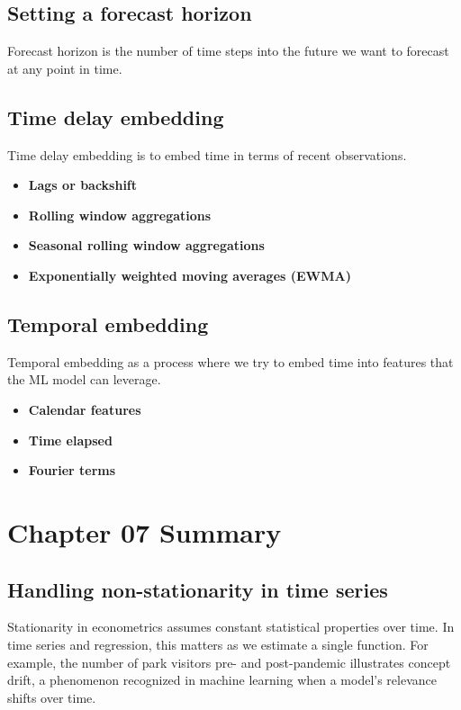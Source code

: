\documentclass{article}
\begin{document}
\subsection{Setting a forecast horizon}
Forecast horizon is the number of time steps into the future we want to forecast at any point in time.

\subsection{Time delay embedding}
Time delay embedding is to embed time in terms of recent observations.
\begin{itemize}
    \item \textbf{Lags or backshift}
    \item \textbf{Rolling window aggregations}
    \item \textbf{Seasonal rolling window aggregations}
    \item \textbf{Exponentially weighted moving averages (EWMA)}
\end{itemize}


\subsection{Temporal embedding}
Temporal embedding as a process where we try to embed time into features that the ML model can leverage. 
\begin{itemize}
    \item \textbf{Calendar features}
    \item \textbf{Time elapsed}
    \item \textbf{Fourier terms}
\end{itemize}

\section{Chapter 07 Summary}

\subsection{Handling non-stationarity in time series}
Stationarity in econometrics assumes constant statistical properties over time. In time series and regression, this matters as we estimate a single function. For example, the number of park visitors pre- and post-pandemic illustrates concept drift, a phenomenon recognized in machine learning when a model's relevance shifts over time.
\end{document}
